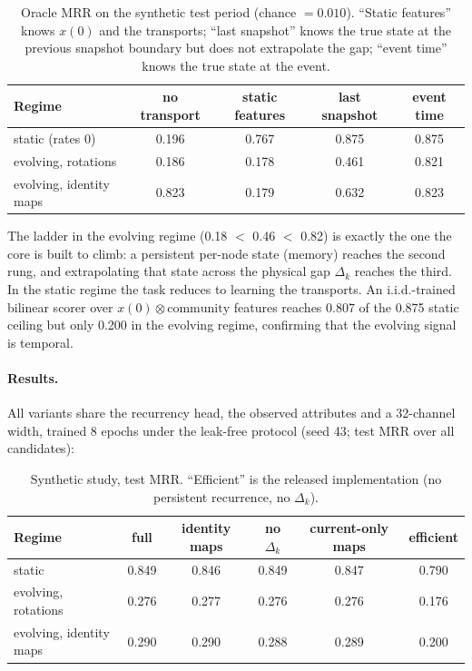 \begin{table}[h]
\centering\small
\caption{Oracle MRR on the synthetic test period (chance $=0.010$).
``Static features'' knows $x(0)$ and the transports; ``last snapshot''
knows the true state at the previous snapshot boundary but does not
extrapolate the gap; ``event time'' knows the true state at the event.}
\begin{tabular}{lcccc}
\toprule
Regime & no transport & static features & last snapshot & event time \\
\midrule
static (rates 0)          & 0.196 & 0.767 & 0.875 & 0.875 \\
evolving, rotations       & 0.186 & 0.178 & 0.461 & 0.821 \\
evolving, identity maps   & 0.823 & 0.179 & 0.632 & 0.823 \\
\bottomrule
\end{tabular}
\end{table}

The ladder in the evolving regime (0.18 $<$ 0.46 $<$ 0.82) is exactly the
one the core is built to climb: a persistent per-node state (memory)
reaches the second rung, and extrapolating that state across the physical
gap $\Delta_k$ reaches the third. In the static regime the task reduces to
learning the transports. An i.i.d.-trained bilinear scorer over
$x(0)\otimes\text{community}$ features reaches 0.807 of the 0.875 static
ceiling but only 0.200 in the evolving regime, confirming that the evolving
signal is temporal.

\paragraph{Results.}
All variants share the recurrency head, the observed attributes and a
32-channel width, trained 8 epochs under the leak-free protocol (seed 43;
test MRR over all candidates):

\begin{table}[h]
\centering\small
\caption{Synthetic study, test MRR. ``Efficient'' is the released
implementation (no persistent recurrence, no $\Delta_k$).}
\begin{tabular}{lccccc}
\toprule
Regime & full & identity maps & no $\Delta_k$ & current-only maps & efficient \\
\midrule
static                  & 0.849 & 0.846 & 0.849 & 0.847 & 0.790 \\
evolving, rotations     & 0.276 & 0.277 & 0.276 & 0.276 & 0.176 \\
evolving, identity maps & 0.290 & 0.290 & 0.288 & 0.289 & 0.200 \\
\bottomrule
\end{tabular}
\end{table}

